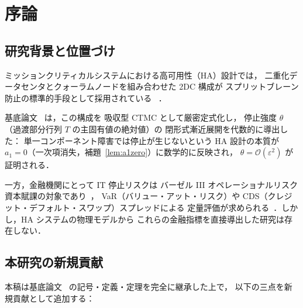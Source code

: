 \documentclass[12pt,a4paper]{article}
\theoremstyle{plain}
\theoremstyle{definition}
\theoremstyle{remark}
\newcommand{\calO}{\mathcal{O}}        %
\newcommand{\eps}{\varepsilon}         %
\begin{document}
\newpage\tableofcontents\newpage

\section{序論}\label{sec:intro}

\subsection{研究背景と位置づけ}

ミッションクリティカルシステムにおける高可用性（HA）設計では，
二重化データセンタとクォーラムノードを組み合わせた 2DC 構成が
スプリットブレーン防止の標準的手段として採用されている
~\cite{lamport1998,gray1993,corbett2012}．

基底論文~\cite{habase:v7} は，この構成を
吸収型 CTMC として厳密定式化し，
停止強度 $\theta$（過渡部分行列 $T$ の主固有値の絶対値）の
閉形式漸近展開を代数的に導出した：
単一コンポーネント障害では停止が生じないという HA 設計の本質が
$a_1 = 0$（一次項消失，補題~\ref{lem:a1zero}）に数学的に反映され，
$\theta = \calO(\eps^2)$ が証明される．

一方，金融機関にとって IT 停止リスクは
バーゼル III オペレーショナルリスク資本賦課の対象であり~\cite{basel2011}，
VaR（バリュー・アット・リスク）や
CDS（クレジット・デフォルト・スワップ）スプレッドによる
定量評価が求められる~\cite{merton1974,lando2004}．しかし，HA システムの物理モデルから
これらの金融指標を直接導出した研究は存在しない．

\subsection{本研究の新規貢献}

本稿は基底論文~\cite{habase:v7} の記号・定義・定理を完全に継承した上で，
以下の三点を新規貢献として追加する：
\end{document}
